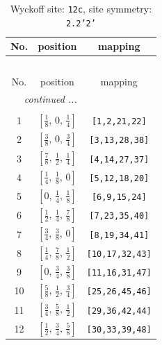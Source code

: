 \documentclass[fleqn,8pt]{jsarticle}
\begin{document}
\begin{longtable}{ccc}
\caption{Wyckoff site: {\tt 12c}, site symmetry: {\tt 2.2'2'}}
 \\
 \hline \hline
No. & position & mapping \\ \hline \endfirsthead

\multicolumn{2}{l}{\tablename\ \thetable{}} \\
 \hline \hline
No. & position & mapping \\ \hline \endhead

 \hline \hline
\multicolumn{2}{r}{\footnotesize\it continued ...} \\ \endfoot

 \hline \hline
\multicolumn{2}{r}{} \\ \endlastfoot

1 & $\left[ \frac{1}{8},\, 0,\, \frac{1}{4} \right]$ & {\tt [1,2,21,22]} \\ \hline
2 & $\left[ \frac{3}{8},\, 0,\, \frac{3}{4} \right]$ & {\tt [3,13,28,38]} \\ \hline
3 & $\left[ \frac{7}{8},\, \frac{1}{2},\, \frac{1}{4} \right]$ & {\tt [4,14,27,37]} \\ \hline
4 & $\left[ \frac{1}{4},\, \frac{1}{8},\, 0 \right]$ & {\tt [5,12,18,20]} \\ \hline
5 & $\left[ 0,\, \frac{1}{4},\, \frac{1}{8} \right]$ & {\tt [6,9,15,24]} \\ \hline
6 & $\left[ \frac{1}{2},\, \frac{1}{4},\, \frac{7}{8} \right]$ & {\tt [7,23,35,40]} \\ \hline
7 & $\left[ \frac{3}{4},\, \frac{3}{8},\, 0 \right]$ & {\tt [8,19,34,41]} \\ \hline
8 & $\left[ \frac{1}{4},\, \frac{7}{8},\, \frac{1}{2} \right]$ & {\tt [10,17,32,43]} \\ \hline
9 & $\left[ 0,\, \frac{3}{4},\, \frac{3}{8} \right]$ & {\tt [11,16,31,47]} \\ \hline
10 & $\left[ \frac{5}{8},\, \frac{1}{2},\, \frac{3}{4} \right]$ & {\tt [25,26,45,46]} \\ \hline
11 & $\left[ \frac{3}{4},\, \frac{5}{8},\, \frac{1}{2} \right]$ & {\tt [29,36,42,44]} \\ \hline
12 & $\left[ \frac{1}{2},\, \frac{3}{4},\, \frac{5}{8} \right]$ & {\tt [30,33,39,48]} \\
\end{longtable}
\renewcommand{\arraystretch}{1.2}
\end{document}
